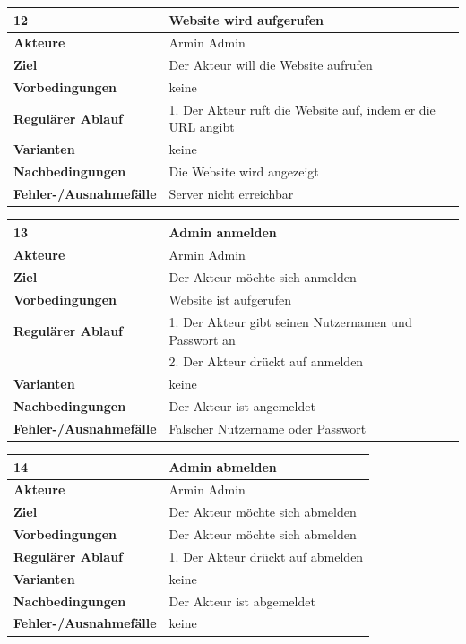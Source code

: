 \documentclass[fontsize=12pt,paper=a4,twoside]{scrartcl}
\begin{document}
\begin{table}
	[H] \label{12} 
	\begin{tabular}
		{|l|p{10cm}|} \hline \textbf{12} & \textbf{Website wird aufgerufen} \\
		\hline \textbf{Akteure} & Armin Admin\\
		\hline \textbf{Ziel} & Der Akteur will die Website aufrufen\\
		\hline \textbf{Vorbedingungen} & keine\\
		\hline \textbf{Regulärer Ablauf} & 1. Der Akteur ruft die Website auf, indem er die URL angibt\\
		\hline \textbf{Varianten} & keine \\
		\hline \textbf{Nachbedingungen} & Die Website wird angezeigt\\
		\hline \textbf{Fehler-/Ausnahmefälle} & Server nicht erreichbar \\
		\hline 
	\end{tabular}
\end{table}

\begin{table}
	[H] \label{13} 
	\begin{tabular}
		{|l|p{10cm}|} \hline \textbf{13} & \textbf{Admin anmelden} \\
		\hline \textbf{Akteure} & Armin Admin\\
		\hline \textbf{Ziel} & Der Akteur möchte sich anmelden\\
		\hline \textbf{Vorbedingungen} & Website ist aufgerufen\\
		\hline \textbf{Regulärer Ablauf} & 1. Der Akteur gibt seinen Nutzernamen und Passwort an\\
		&2. Der Akteur drückt auf anmelden\\
		\hline \textbf{Varianten} & keine \\
		\hline \textbf{Nachbedingungen} & Der Akteur ist angemeldet\\
		\hline \textbf{Fehler-/Ausnahmefälle} & Falscher Nutzername oder Passwort \\
		\hline 
	\end{tabular}
\end{table}

\begin{table}
	[H] \label{14} 
	\begin{tabular}
		{|l|p{10cm}|} \hline \textbf{14} & \textbf{Admin abmelden} \\
		\hline \textbf{Akteure} & Armin Admin\\
		\hline \textbf{Ziel} & Der Akteur möchte sich abmelden\\
		\hline \textbf{Vorbedingungen} & Der Akteur möchte sich abmelden\\
		\hline \textbf{Regulärer Ablauf} & 1. Der Akteur drückt auf abmelden\\
		\hline \textbf{Varianten} & keine \\
		\hline \textbf{Nachbedingungen} & Der Akteur ist abgemeldet\\
		\hline \textbf{Fehler-/Ausnahmefälle} & keine \\
		\hline 
	\end{tabular}
\end{table}
\end{document}
